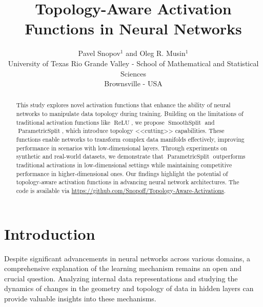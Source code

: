 \documentclass{esannV2}
\DeclareMathOperator{\relu}{\mathrm{ReLU}}
\DeclareMathOperator{\smoothsplit}{\mathrm{SmoothSplit}}
\DeclareMathOperator{\parametricsplit}{\mathrm{ParametricSplit}}
\begin{document}
\title{Topology-Aware Activation Functions in Neural Networks}

\author{Pavel Snopov$^1$ and Oleg R. Musin$^1$
  \vspace{.3cm}\\
  University of Texas Rio Grande Valley - School of Mathematical and Statistical Sciences \\
  Brownsville - USA
}

\maketitle

\begin{abstract}
  This study explores novel activation functions that enhance the ability of neural networks to manipulate data topology during training. Building on the limitations of traditional activation functions like \( \relu \), we propose \( \smoothsplit \) and \( \parametricsplit \), which introduce topology <<cutting>> capabilities. These functions enable networks to transform complex data manifolds effectively, improving performance in scenarios with low-dimensional layers. Through experiments on synthetic and real-world datasets, we demonstrate that \( \parametricsplit \) outperforms traditional activations in low-dimensional settings while maintaining competitive performance in higher-dimensional ones. Our findings highlight the potential of topology-aware activation functions in advancing neural network architectures. The code is available via \url{https://github.com/Snopoff/Topology-Aware-Activations}.
\end{abstract}

\section{Introduction}
Despite significant advancements in neural networks across various domains, a comprehensive explanation of the learning mechanism remains an open and crucial question. Analyzing internal data representations and studying the dynamics of changes in the geometry and topology of data in hidden layers can provide valuable insights into these mechanisms.
\end{document}
